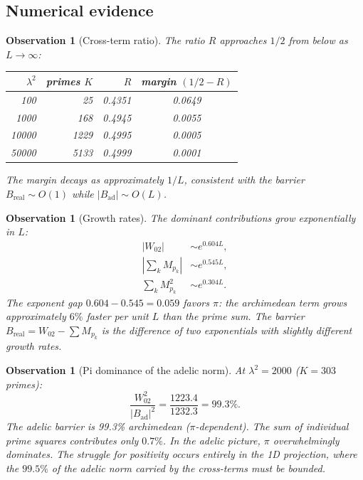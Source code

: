 \documentclass[11pt,a4paper]{article}
\newtheorem{observation}[theorem]{Observation}
\theoremstyle{definition}
\begin{document}
\subsection{Numerical evidence}

\begin{observation}[Cross-term ratio]
The ratio $R$ approaches $1/2$ from below as $L \to \infty$:
\begin{center}
\begin{tabular}{rrrc}
\toprule
$\lambda^2$ & primes $K$ & $R$ & margin $(1/2 - R)$ \\
\midrule
100 & 25 & 0.4351 & 0.0649 \\
1000 & 168 & 0.4945 & 0.0055 \\
10000 & 1229 & 0.4995 & 0.0005 \\
50000 & 5133 & 0.4999 & 0.0001 \\
\bottomrule
\end{tabular}
\end{center}
The margin decays as approximately $1/L$, consistent with the barrier $B_{\mathrm{real}} \sim O(1)$ while $|B_{\mathrm{ad}}| \sim O(L)$.
\end{observation}

\begin{observation}[Growth rates]\label{obs:growth-rates}
The dominant contributions grow exponentially in $L$:
\begin{align*}
|W_{02}| &\sim e^{0.604 L}, \\
\left|\sum_k M_{p_k}\right| &\sim e^{0.545 L}, \\
\sum_k M_{p_k}^2 &\sim e^{0.304 L}.
\end{align*}
The exponent gap $0.604 - 0.545 = 0.059$ favors $\pi$: the archimedean term grows approximately $6\%$ faster per unit $L$ than the prime sum. The barrier $B_{\mathrm{real}} = W_{02} - \sum M_{p_k}$ is the difference of two exponentials with slightly different growth rates.
\end{observation}

\begin{observation}[Pi dominance of the adelic norm]
At $\lambda^2 = 2000$ ($K = 303$ primes):
\[
\frac{W_{02}^2}{|B_{\mathrm{ad}}|^2} = \frac{1223.4}{1232.3} = 99.3\%.
\]
The adelic barrier is 99.3\% archimedean ($\pi$-dependent). The sum of individual prime squares contributes only $0.7\%$. In the adelic picture, $\pi$ overwhelmingly dominates. The struggle for positivity occurs entirely in the 1D projection, where the $99.5\%$ of the adelic norm carried by the cross-terms must be bounded.
\end{observation}
\end{document}
